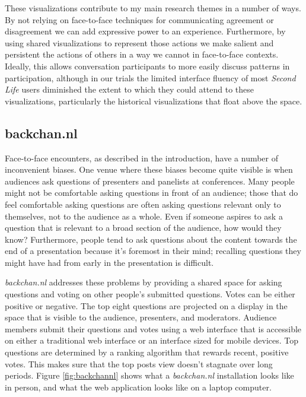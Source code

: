 \documentclass{tufte-handout}
\begin{document}
These visualizations contribute to my main research themes in a number of ways. By not relying on face-to-face techniques for communicating agreement or disagreement  we can add expressive power to an experience. Furthermore, by using shared visualizations to represent those actions we make salient and persistent the actions of others in a way we cannot in face-to-face contexts. Ideally, this allows conversation participants to more easily discuss patterns in participation, although in our trials the limited interface fluency of most \emph{Second Life} users diminished the extent to which they could attend to these visualizations, particularly the historical visualizations that float above the space.



\subsection{backchan.nl}

Face-to-face encounters, as described in the introduction, have a number of inconvenient biases. One venue where these biases become quite visible is when audiences ask questions of presenters and panelists at conferences. Many people might not be comfortable asking questions in front of an audience; those that do feel comfortable asking questions are often asking questions relevant only to themselves, not to the audience as a whole. Even if someone aspires to ask a question that is relevant to a broad section of the audience, how would they know? Furthermore, people tend to ask questions about the content towards the end of a presentation because it's foremost in their mind; recalling questions they might have had from early in the presentation is difficult.

\emph{backchan.nl} addresses these problems by providing a shared space for asking questions and voting on other people's submitted questions. Votes can be either positive or negative. The top eight questions are projected on a display in the space that is visible to the audience, presenters, and moderators. Audience members submit their questions and votes using a web interface that is accessible on either a traditional web interface or an interface sized for mobile devices. Top questions are determined by a ranking algorithm that rewards recent, positive votes. This makes sure that the top posts view doesn't stagnate over long periods. Figure \ref{fig:backchannl} shows what a \emph{backchan.nl} installation looks like in person, and what the web application looks like on a laptop computer. 
\end{document}
